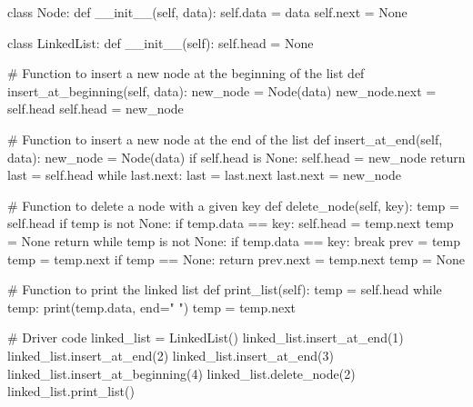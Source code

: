 class Node:
    def __init__(self, data):
        self.data = data
        self.next = None

class LinkedList:
    def __init__(self):
        self.head = None

    # Function to insert a new node at the beginning of the list
    def insert_at_beginning(self, data):
        new_node = Node(data)
        new_node.next = self.head
        self.head = new_node

    # Function to insert a new node at the end of the list
    def insert_at_end(self, data):
        new_node = Node(data)
        if self.head is None:
            self.head = new_node
            return
        last = self.head
        while last.next:
            last = last.next
        last.next = new_node

    # Function to delete a node with a given key
    def delete_node(self, key):
        temp = self.head
        if temp is not None:
            if temp.data == key:
                self.head = temp.next
                temp = None
                return
        while temp is not None:
            if temp.data == key:
                break
            prev = temp
            temp = temp.next
        if temp == None:
            return
        prev.next = temp.next
        temp = None

    # Function to print the linked list
    def print_list(self):
        temp = self.head
        while temp:
            print(temp.data, end=" ")
            temp = temp.next

# Driver code
linked_list = LinkedList()
linked_list.insert_at_end(1)
linked_list.insert_at_end(2)
linked_list.insert_at_end(3)
linked_list.insert_at_beginning(4)
linked_list.delete_node(2)
linked_list.print_list()
